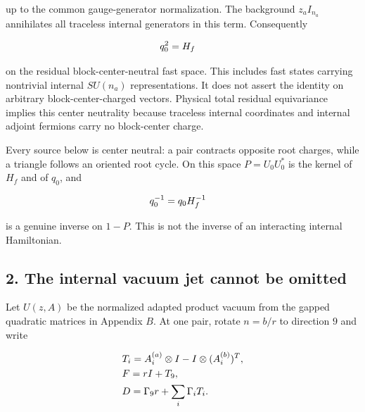 up to the common gauge-generator normalization. The background
\(z_{a} I_{n_{a}}\) annihilates all traceless internal generators in
this term. Consequently

\begin{gather*}
\begin{aligned}
& q_{0}^{2} = H_{f}
\end{aligned}\notag
\end{gather*}

on the residual block-center-neutral fast space. This includes fast
states carrying nontrivial internal \(SU(n_{a})\) representations. It
does not assert the identity on arbitrary block-center-charged vectors.
Physical total residual equivariance implies this center neutrality
because traceless internal coordinates and internal adjoint fermions
carry no block-center charge.

Every source below is center neutral: a pair contracts opposite root
charges, while a triangle follows an oriented root cycle. On this space
\(P=U_{0} U_{0}^{*}\) is the kernel of \(H_{f}\) and of \(q_{0}\), and

\begin{gather*}
\begin{aligned}
& q_{0}^{-1} = q_{0} H_{f}^{-1}
\end{aligned}\notag
\end{gather*}

is a genuine inverse on \(1-P\). This is not the inverse of an
interacting internal Hamiltonian.

\subsection{2. The internal vacuum jet cannot be
omitted}\label{c-the-internal-vacuum-jet-cannot-be-omitted}

Let \(U(z,A)\) be the normalized adapted product vacuum from the gapped
quadratic matrices in Appendix \(B\). At one pair, rotate \(n=b/r\) to
direction \(9\) and write

\begin{gather*}
\begin{aligned}
& T_{i} = A_{i}^{(a)} \otimes  I - I \otimes  (A_{i}^{(b)})^{T}, \\
& F = rI + T_{9}, \\
& D = \Gamma _{9} r + \sum _{i} \Gamma _{i} T_{i}.
\end{aligned}\notag
\end{gather*}

